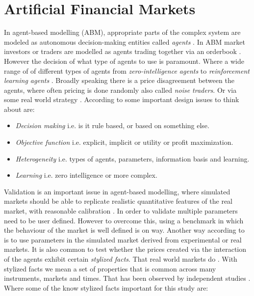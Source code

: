 \documentclass{kththesis}
\theoremstyle{definition}
\begin{document}


\newpage

\section{Artificial Financial Markets}
In agent-based modelling (ABM), appropriate parts of the complex system are modeled as autonomous decision-making entities called \textit{agents} \parencite{darley2007nasdaq}. In ABM market investors or traders are modelled as agents trading together via an orderbook \parencite{lussange2018bright}. However the decision of what type of agents to use is paramount. Where a wide range of of different types of agents from \textit{zero-intelligence agents} to \textit{reinforcement learning agents} \parencite{martinez2009evolutionary}. Broadly speaking there is a price disagreement between the agents, where often pricing is done randomly also called \textit{noise traders}. Or via some real world strategy \parencite{lussange2018bright}. According to \textcite{martinez2009evolutionary} some important design issues to think about are:

\begin{itemize}
    \item \textit{Decision making} i.e. is it rule based, or based on something else.
    \item \textit{Objective function} i.e. explicit, implicit or utility or profit maximization.
    \item \textit{Heterogeneity} i.e. types of agents, parameters, information basis and learning.
    \item \textit{Learning} i.e. zero intelligence or more complex.
\end{itemize}
Validation is an important issue in agent-based modelling, where simulated markets should be able to replicate realistic quantitative features of the real market, with reasonable calibration \parencite{martinez2009evolutionary}. In order to validate multiple parameters need to be user defined. However to overcome this, using a benchmark in which the behaviour of the market is well defined is on way. Another way according to \textcite{martinez2009evolutionary} is to use parameters in the simulated market derived from experimental or real markets. 
\newline
\newline
It is also common to test whether the prices created via the interaction of the agents exhibit certain \textit{stylized facts}. That real world markets do \parencite{brandouy2011design}. With stylized facts we mean a set of properties that is common across many instruments, markets and times. That has been observed by independent studies \parencite{cont2001empirical}. Where some of the know stylized facts important for this study are:
\end{document}

